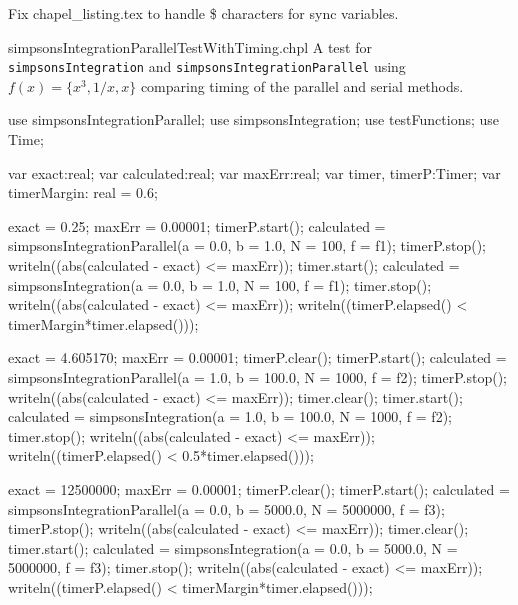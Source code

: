 \begin{TODO}
  Fix chapel\_listing.tex to handle \$ characters for sync variables.
\end{TODO}

\begin{chapelexample}{simpsonsIntegrationParallelTestWithTiming.chpl}
  A test for \lstinline{simpsonsIntegration} and \lstinline{simpsonsIntegrationParallel} 
  using $f(x) = \{x^3, 1/x, x\}$ comparing timing of the parallel and serial methods.
  \begin{chapelpre}
  \end{chapelpre}
  \begin{chapel}
    use simpsonsIntegrationParallel;
    use simpsonsIntegration;
    use testFunctions;
    use Time;

    var exact:real;
    var calculated:real;
    var maxErr:real;
    var timer, timerP:Timer;
    var timerMargin: real = 0.6;

    exact = 0.25;
    maxErr = 0.00001;
    timerP.start();
    calculated = simpsonsIntegrationParallel(a = 0.0, b = 1.0, N = 100, f = f1);
    timerP.stop();
    writeln((abs(calculated - exact) <= maxErr));
    timer.start();
    calculated = simpsonsIntegration(a = 0.0, b = 1.0, N = 100, f = f1);
    timer.stop();
    writeln((abs(calculated - exact) <= maxErr));
    writeln((timerP.elapsed() < timerMargin*timer.elapsed()));

    exact = 4.605170;
    maxErr = 0.00001;
    timerP.clear();
    timerP.start();
    calculated = simpsonsIntegrationParallel(a = 1.0, b = 100.0, N = 1000, f = f2);
    timerP.stop();
    writeln((abs(calculated - exact) <= maxErr));
    timer.clear();
    timer.start();
    calculated = simpsonsIntegration(a = 1.0, b = 100.0, N = 1000, f = f2);
    timer.stop();
    writeln((abs(calculated - exact) <= maxErr));
    writeln((timerP.elapsed() < 0.5*timer.elapsed()));

    exact = 12500000;
    maxErr = 0.00001;
    timerP.clear();
    timerP.start();
    calculated = simpsonsIntegrationParallel(a = 0.0, b = 5000.0, N = 5000000, f = f3);
    timerP.stop();
    writeln((abs(calculated - exact) <= maxErr));
    timer.clear();
    timer.start();
    calculated = simpsonsIntegration(a = 0.0, b = 5000.0, N = 5000000, f = f3);
    timer.stop();
    writeln((abs(calculated - exact) <= maxErr));
    writeln((timerP.elapsed() < timerMargin*timer.elapsed()));


\end{chapel}
\end{chapelexample}
